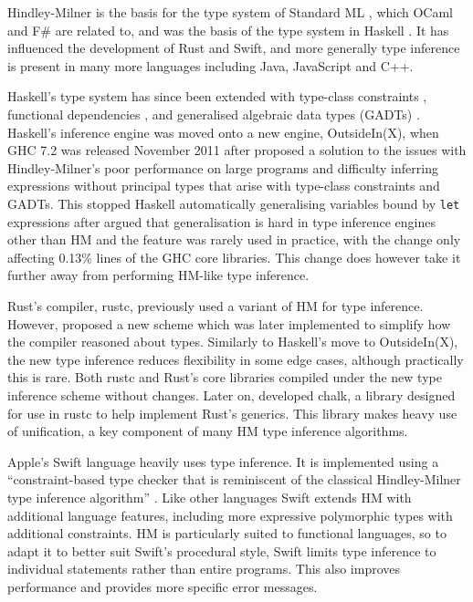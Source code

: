\documentclass[a4paper,fleqn,oneside,12pt]{report}
\begin{document}
Hindley-Milner is the basis for the type system of Standard ML \citep{ref15}, which OCaml and F\# are related to, and was the basis of the type system in Haskell \citep{ref16}. It has influenced the development of Rust and Swift, and more generally type inference is present in many more languages including Java, JavaScript and C++.

Haskell's type system has since been extended with type-class constraints \citep{ref17}, functional dependencies \citep{ref18}, and generalised algebraic data types (GADTs) \citep{ref19}. Haskell’s inference engine was moved onto a new engine, OutsideIn(X), when GHC 7.2 was released November 2011 after \cite{ref20} proposed a solution to the issues with Hindley-Milner’s poor performance on large programs and difficulty inferring expressions without principal types that arise with type-class constraints and GADTs. This stopped Haskell automatically generalising variables bound by \texttt{let} expressions after \cite{ref21} argued that generalisation is hard in type inference engines other than HM and the feature was rarely used in practice, with the change only affecting 0.13\% lines of the GHC core libraries. This change does however take it further away from performing HM-like type inference.

Rust’s compiler, rustc, previously used a variant of HM for type inference. However, \cite{ref22} proposed a new scheme which was later implemented to simplify how the compiler reasoned about types. Similarly to Haskell’s move to OutsideIn(X), the new type inference reduces flexibility in some edge cases, although practically this is rare. Both rustc and Rust’s core libraries compiled under the new type inference scheme without changes. Later on, \cite{ref23} developed chalk, a library designed for use in rustc to help implement Rust’s generics. This library makes heavy use of unification, a key component of many HM type inference algorithms.

Apple's Swift language heavily uses type inference. It is implemented using a ``constraint-based type checker that is reminiscent of the classical Hindley-Milner type inference algorithm'' \citep{ref24}. Like other languages Swift extends HM with additional language features, including more expressive polymorphic types with additional constraints. HM is particularly suited to functional languages, so to adapt it to better suit Swift's procedural style, Swift limits type inference to individual statements rather than entire programs. This also improves performance and provides more specific error messages.
\end{document}
